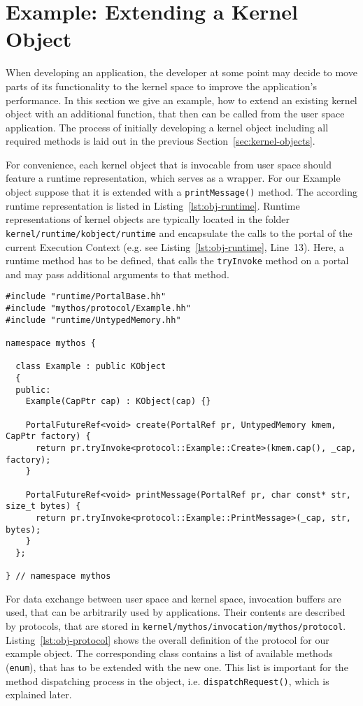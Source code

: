 \section{Example: Extending a Kernel Object}
\label{sec:objects-example}

When developing an application, the developer at some point may decide to move
parts of its functionality to the kernel space to improve the application's
performance. In this section we give an example, how to extend an existing
kernel object with an additional function, that then can be called from the user space
application. The process of initially developing a kernel object including all
required methods is laid out in the previous Section~\ref{sec:kernel-objects}.

For convenience, each kernel object that is invocable from user space should
feature a runtime representation, which serves as a wrapper.  For our Example
object suppose that it is extended with a \texttt{printMessage()} method.  
The according runtime representation is listed in
Listing~\ref{lst:obj-runtime}. Runtime representations of kernel objects are
typically located in the folder \texttt{kernel/runtime/kobject/runtime} and
encapsulate the calls to the portal of the current Execution Context (e.g. see
Listing~\ref{lst:obj-runtime}, Line~13). Here, a runtime method has to be
defined, that calls the \texttt{tryInvoke} method on a portal and may pass
additional arguments to that method.

\lstset{language=c++,caption=Object's Runtime Representation,label=lst:obj-runtime}
\begin{lstlisting}
#include "runtime/PortalBase.hh"
#include "mythos/protocol/Example.hh"
#include "runtime/UntypedMemory.hh"

namespace mythos {

  class Example : public KObject
  {
  public:
    Example(CapPtr cap) : KObject(cap) {}

    PortalFutureRef<void> create(PortalRef pr, UntypedMemory kmem, CapPtr factory) {
      return pr.tryInvoke<protocol::Example::Create>(kmem.cap(), _cap, factory);
    }

    PortalFutureRef<void> printMessage(PortalRef pr, char const* str, size_t bytes) {
      return pr.tryInvoke<protocol::Example::PrintMessage>(_cap, str, bytes);
    }
  };

} // namespace mythos
\end{lstlisting}

For data exchange between user space and kernel space, invocation buffers are
used, that can be arbitrarily used by applications. Their contents are described
by protocols, that are stored in
\texttt{kernel/mythos/invocation/mythos/protocol}.
Listing~\ref{lst:obj-protocol} shows the overall definition of the protocol for
our example object. The corresponding class contains a list of available
methods (\texttt{enum}), that has to be extended with the new one. This list is important
for the method dispatching process in the object, i.e. \texttt{dispatchRequest()},
which is explained later. 

